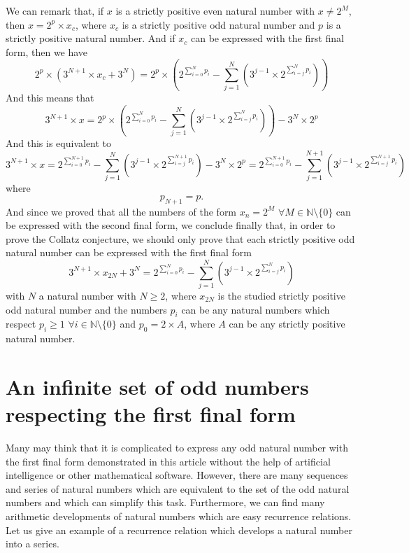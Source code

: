 \documentclass[11pt,a4paper]{article}
\newcommand{\N}{\mathbb{N}}
\newcommand{\Pf}[4]{2^{\sum_{#4=0}^{#1}#3_{#4}}-\sum_{j=1}^{#2}\left(3^{j-1}\times 2^{\sum_{#4=j}^{#1}#3_{#4}}\right)}
\theoremstyle{definition}
\begin{document}
We can remark that, if $x$ is a strictly positive even natural number with $x\ne 2^{M}$,
then $x=2^{p}\times x_c$, where $x_c$ is a strictly positive odd natural number and $p$ is a
strictly positive natural number. And if $x_c$ can be expressed with the first final form,
then we have
\begin{equation}
2^{p}\times\left(3^{N+1}\times x_c+3^{N}\right)=2^{p}\times\left(\Pf{N}{N}{p}{i}\right)
\end{equation}
And this means that
\begin{equation}
3^{N+1}\times x=2^{p}\times\left(\Pf{N}{N}{p}{i}\right)-3^{N}\times 2^{p}
\end{equation}
And this is equivalent to
\begin{equation}
3^{N+1}\times x=2^{\sum_{i=0}^{N+1}p_i}-\sum_{j=1}^{N}\left(3^{j-1}\times 2^{\sum_{i=j}^{N+1}p_i}\right)-3^{N}\times 2^{p}
=2^{\sum_{i=0}^{N+1}p_i}-\sum_{j=1}^{N+1}\left(3^{j-1}\times 2^{\sum_{i=j}^{N+1}p_i}\right)
\end{equation}
where
\begin{equation}
p_{N+1}=p.
\end{equation}
And since we proved that all the numbers of the form $x_n=2^{M}$ $\forall M\in\N\setminus\{0\}$
can be expressed with the second final form, we conclude finally that, in order to prove the
Collatz conjecture, we should only prove that each strictly positive odd natural number can
be expressed with the first final form
\[3^{N+1}\times x_{2N}+3^{N}=\Pf{N}{N}{p}{i}\]
with $N$ a natural number with $N\ge 2$, where $x_{2N}$ is the studied strictly positive
odd natural number and the numbers $p_i$ can be any natural numbers which respect
$p_i\ge 1$ $\forall i\in\N\setminus\{0\}$ and $p_0=2\times A$, where $A$ can be any strictly
positive natural number.

\section{An infinite set of odd numbers respecting the first final form}\label{sec:infinite}
Many may think that it is complicated to express any odd natural number with the first
final form demonstrated in this article without the help of artificial intelligence or
other mathematical software. However, there are many sequences and series of natural
numbers which are equivalent to the set of the odd natural numbers and which can simplify
this task. Furthermore, we can find many arithmetic developments of natural numbers which
are easy recurrence relations. Let us give an example of a recurrence relation which
develops a natural number into a series.
\end{document}
